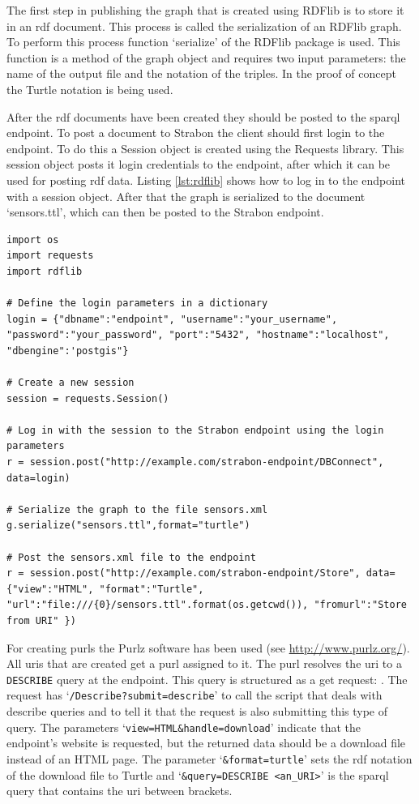 The first step in publishing the graph that is created using RDFlib is to store it in an \ac{rdf} document. This process is called the serialization of an RDFlib graph. To perform this process function `serialize' of the RDFlib package is used. This function is a method of the graph object and requires two input parameters: the name of the output file and the notation of the triples. In the proof of concept the Turtle notation is being used. 

After the \ac{rdf} documents have been created they should be posted to the \ac{sparql} endpoint. To post a document to Strabon the client should first login to the endpoint. To do this a Session object is created using the Requests library. This session object posts it login credentials to the endpoint, after which it can be used for posting \ac{rdf} data. Listing \ref{lst:rdflib} shows how to log in to the endpoint with a session object. After that the graph is serialized to the document `sensors.ttl', which can then be posted to the Strabon endpoint.   

\begin{lstlisting}[float,caption={Serializing the RDFlib graph object and posting it to the Strabon endpoint}, label={lst:rdflib}]
import os
import requests
import rdflib

# Define the login parameters in a dictionary
login = {"dbname":"endpoint", "username":"your_username", "password":"your_password", "port":"5432", "hostname":"localhost", "dbengine":'postgis"}

# Create a new session
session = requests.Session()

# Log in with the session to the Strabon endpoint using the login parameters
r = session.post("http://example.com/strabon-endpoint/DBConnect", data=login)

# Serialize the graph to the file sensors.xml
g.serialize("sensors.ttl",format="turtle")

# Post the sensors.xml file to the endpoint
r = session.post("http://example.com/strabon-endpoint/Store", data={"view":"HTML", "format":"Turtle", "url":"file:///{0}/sensors.ttl".format(os.getcwd()), "fromurl":"Store from URI" }) 
\end{lstlisting}  


For creating \aclp{purl} the Purlz software has been used (see \url{http://www.purlz.org/}). All \acp{uri} that are created get a \ac{purl} assigned to it. The \ac{purl} resolves the \ac{uri} to a \texttt{DESCRIBE} query at the endpoint. This query is structured as a get request: \texttt{}. The request has `\texttt{/Describe?submit=describe}' to call the script that deals with describe queries and to tell it that the request is also submitting this type of query. The parameters `\texttt{view=HTML\&handle=download}' indicate that the endpoint's website is requested, but the returned data should be a download file instead of an HTML page. The parameter `\texttt{\&format=turtle}' sets the \ac{rdf} notation of the download file to Turtle and `\texttt{\&query=DESCRIBE <an\_URI>}' is the \ac{sparql} query that contains the \ac{uri} between brackets. 

